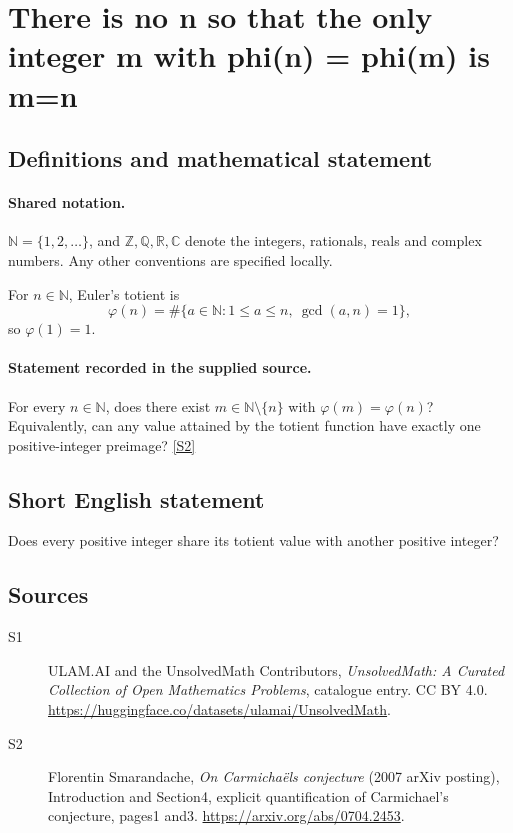 \documentclass[11pt]{article}
\newcommand{\sref}[2]{\hyperlink{source:#1:#2}{[S#2]}}
\begin{document}
\section{There is no n so that the only integer m with phi(n) = phi(m) is m=n}\label{statement}

\subsection{Definitions and mathematical statement}

\paragraph{Shared notation.}$\mathbb N=\{1,2,\ldots\}$, and $\mathbb Z,\mathbb Q,\mathbb R,\mathbb C$ denote the integers, rationals, reals and complex numbers. Any other conventions are specified locally.


For $n\in\mathbb N$, Euler's totient is
\[\varphi(n)=\#\{a\in\mathbb N:1\le a\le n,\ \gcd(a,n)=1\},\]
so $\varphi(1)=1$.

\paragraph{Statement recorded in the supplied source.}
For every $n\in\mathbb N$, does there exist $m\in\mathbb N\setminus\{n\}$ with $\varphi(m)=\varphi(n)$? Equivalently, can any value attained by the totient function have exactly one positive-integer preimage? \sref{statement}{2}

\subsection{Short English statement}
Does every positive integer share its totient value with another positive integer?
\subsection{Sources}
\begin{description}
\item[\hypertarget{source:statement:1}{S1}] ULAM.AI and the UnsolvedMath Contributors, \emph{UnsolvedMath: A Curated Collection of Open Mathematics Problems}, catalogue entry. CC BY 4.0. \url{https://huggingface.co/datasets/ulamai/UnsolvedMath}.
\item[\hypertarget{source:statement:2}{S2}] Florentin Smarandache, \emph{On Carmichaël\textquotesingle s conjecture} (2007 arXiv posting), Introduction and Section4, explicit quantification of Carmichael’s conjecture, pages1 and3. \url{https://arxiv.org/abs/0704.2453}.
\end{description}
\label{end:statement}
\end{document}

